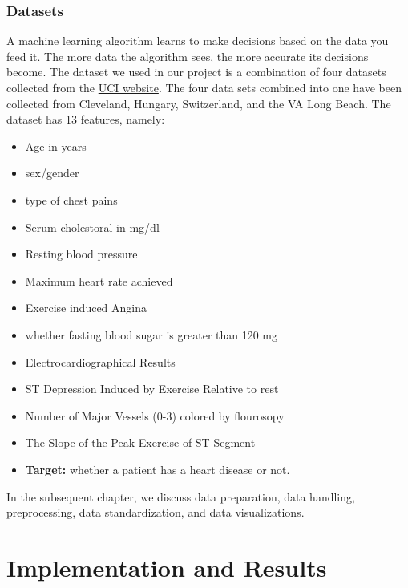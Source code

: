 \subsubsection{Datasets}
A machine learning algorithm learns to make decisions based on the data you feed it. The more data the algorithm sees, the more accurate its decisions become. The dataset we used in our project is a combination of four datasets collected from the \href{https://archive.ics.uci.edu/ml/datasets/heart+disease}{UCI website}. The four data sets combined into one have been collected from Cleveland, Hungary, Switzerland, and the VA Long Beach. The dataset has 13 features, namely:
\begin{itemize}
    \item Age in years
    \item sex/gender
    \item type of chest pains
    \item Serum cholestoral in mg/dl
    \item Resting blood pressure
    \item Maximum heart rate achieved
    \item Exercise induced Angina
    \item whether fasting blood sugar is greater than 120 mg
    \item Electrocardiographical Results
    \item ST Depression Induced by Exercise Relative to rest
    \item Number of Major Vessels (0-3) colored by flourosopy
    \item The Slope of the Peak Exercise of ST Segment
    \item \textbf{Target:} whether a patient has a heart disease or not.
\end{itemize}
In the subsequent chapter, we discuss data preparation, data handling, preprocessing, data standardization, and data visualizations.




\newpage
\section{Implementation and Results}
